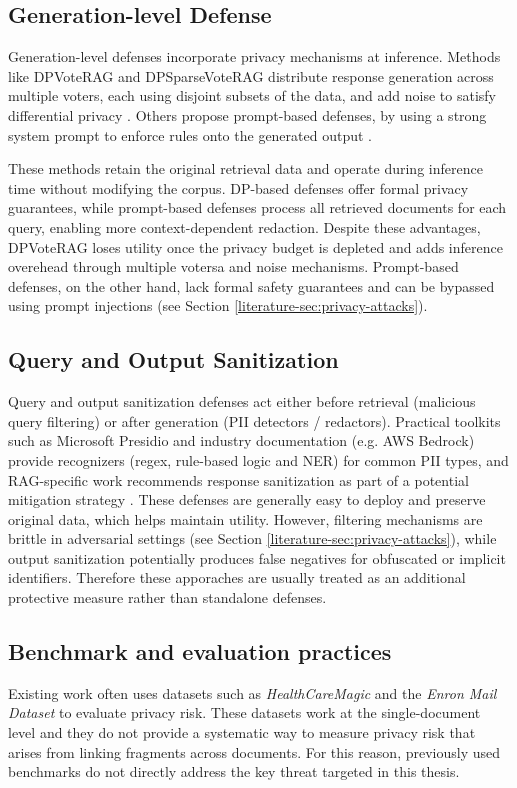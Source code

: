 \subsection{Generation-level Defense} Generation-level defenses incorporate privacy mechanisms at inference. Methods like DPVoteRAG and DPSparseVoteRAG distribute response generation across multiple voters, each using disjoint subsets of the data, and add noise to satisfy differential privacy \cite{DPVoteRAG}. Others propose prompt-based defenses, by using a strong system prompt to enforce rules onto the generated output \cite{anthropic_strengthen_guardrails,aws_secure_rag,goodAndBad}. 

These methods retain the original retrieval data and operate during inference time without modifying the corpus. DP-based defenses offer formal privacy guarantees, while prompt-based defenses process all retrieved documents for each query, enabling more context-dependent redaction. Despite these advantages, DPVoteRAG loses utility once the privacy budget is depleted and adds inference overehead through multiple votersa and noise mechanisms. Prompt-based defenses, on the other hand, lack formal safety guarantees and can be bypassed using prompt injections (see Section \ref{literature-sec:privacy-attacks}). 


\subsection{Query and Output Sanitization} Query and output sanitization defenses act either before retrieval (malicious query filtering) or after generation (PII detectors / redactors). Practical toolkits such as Microsoft Presidio and industry documentation (e.g. AWS Bedrock) provide recognizers (regex, rule-based logic and NER) for common PII types, and RAG-specific work recommends response sanitization as part of a potential mitigation strategy \cite{aws_bedrock_privacy,ragThief,microsoft_presidio}. These defenses are generally easy to deploy and preserve original data, which helps maintain utility. However, filtering mechanisms are brittle in adversarial settings (see Section \ref{literature-sec:privacy-attacks}), while  output sanitization potentially produces false negatives for obfuscated or implicit identifiers. Therefore these apporaches are usually treated as an additional protective measure rather than standalone defenses.


\subsection{Benchmark and evaluation practices}
Existing work often uses datasets such as  \textit{HealthCareMagic} and the \textit{Enron Mail Dataset} to evaluate privacy risk. These datasets work at the single-document level and they do not provide a systematic way to measure privacy risk that arises from linking fragments across documents. For this reason, previously used benchmarks do not directly address the key threat targeted in this thesis. 

